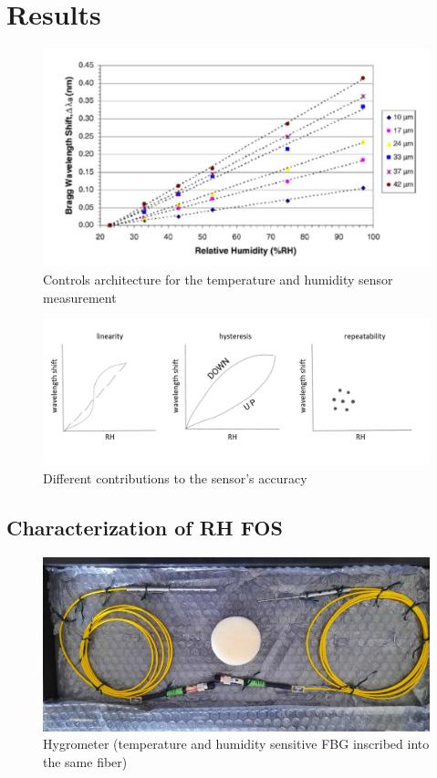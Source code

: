 \newpage


\section{Results}
\label{fbg_results}

\begin{figure}[!h]
\centering
\includegraphics[width=0.85\columnwidth]{Chapter5/images/yeo_coating.png}
\caption{Controls architecture for the temperature and humidity sensor measurement}
\label{fig:fos_coating0}
\end{figure}


\begin{figure}[!h]
\centering
\includegraphics[width=0.85\columnwidth]{Chapter5/images/uncerainty.png}
\caption{Different contributions to the sensor's accuracy}
\label{fig:accuracy}
\end{figure}
\subsection{Characterization of RH FOS}

\begin{figure}[!h]
\centering
\includegraphics[width=0.65\columnwidth]{Chapter5/images/single1.jpeg}
\caption{Hygrometer (temperature and humidity sensitive FBG inscribed into the same fiber)}
\label{fig_single_photo}
\end{figure}

